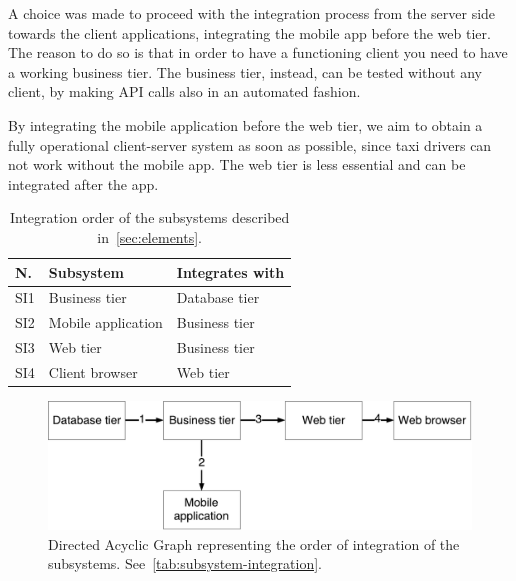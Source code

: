 A choice was made to proceed with the integration process from the server side towards the client applications, integrating the mobile app before the web tier.
The reason to do so is that in order to have a functioning client you need to have a working business tier.
The business tier, instead, can be tested without any client, by making API calls also in an automated fashion.

By integrating the mobile application before the web tier, we aim to obtain a fully operational client-server system as soon as possible, since taxi drivers can not work without the mobile app.
The web tier is less essential and can be integrated after the app.

\begin{table}
    \centering
    \begin{tabular}{| l | l | l |}
        \hline
        \textbf{N.} & \textbf{Subsystem} & \textbf{Integrates with} \\
        \hline
        SI1 & Business tier & Database tier\\
        SI2 & Mobile application & Business tier\\
        SI3 & Web tier & Business tier\\
        SI4 & Client browser & Web tier\\
        \hline
    \end{tabular}
    \caption{Integration order of the subsystems described in~\autoref{sec:elements}.}
    \label{tab:subsystem-integration}
\end{table}

\begin{figure}
    \centering
    \includegraphics[width=\textwidth]{figures/subsystems_integration_dag.pdf}
    \caption{Directed Acyclic Graph representing the order of integration of the subsystems. See~\autoref{tab:subsystem-integration}.}
    \label{fig:subsystem-integration}
\end{figure}
